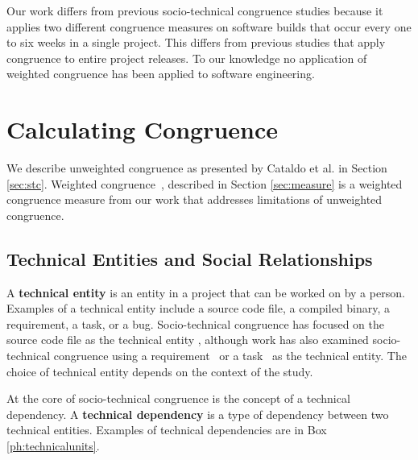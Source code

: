Our work differs from previous socio-technical congruence studies because it applies two different congruence measures on software builds that occur every one to six weeks in a single project. This differs from previous studies that apply congruence to entire project releases. To our knowledge no application of weighted congruence has been applied to software engineering.




\section{Calculating Congruence}
\label{sec:congruence}

We describe unweighted congruence as presented by Cataldo et al. \cite{cataldo2006:coordination_reqs} in Section \ref{sec:stc}. Weighted congruence~\cite{kwan2009:weighted}, described in Section \ref{sec:measure} is a weighted congruence measure from our work that addresses limitations of unweighted congruence.

\subsection{Technical Entities and Social Relationships}

A \textbf{technical entity} is an entity in a project that can be worked on by a person. Examples of a technical entity include a source code file, a compiled binary, a requirement, a task, or a bug. Socio-technical congruence has focused on the source code file as the technical entity \cite{cataldo2006:coordination_reqs, ehrlich2008:gaps}, although work has also examined socio-technical congruence using a requirement~\cite{damian2010:rdc,marczak2009:crossfunctional} or a task~\cite{wolf2009:mining} as the technical entity. The choice of technical entity depends on the context of the study.

At the core of socio-technical congruence is the concept of a technical dependency. A \textbf{technical dependency} is a type of dependency between two technical entities. Examples of technical dependencies are in Box \ref{ph:technicalunits}.

